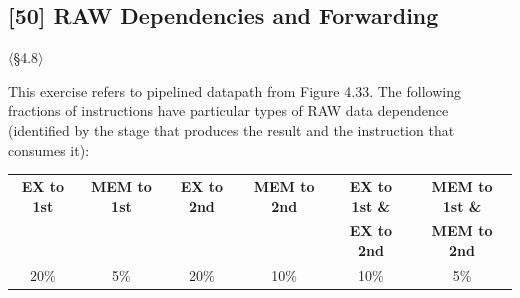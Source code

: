 \problembreak

\subsection{[50] RAW Dependencies and Forwarding}
\hypertarget{prob-4.26}{}
\noindent$\langle$\S4.8$\rangle$\medskip

\noindent This exercise refers to pipelined datapath from Figure 4.33. The
following fractions of instructions have particular types of RAW data
dependence (identified by the stage that produces the result and the
instruction that consumes it):

\begin{center}
\begin{tabular}{cccccc}
\toprule
\textbf{EX to 1st} & \textbf{MEM to 1st} & \textbf{EX to 2nd} &
\textbf{MEM to 2nd} & \textbf{EX to 1st \&} & \textbf{MEM to 1st \&} \\
& & & & \textbf{EX to 2nd} & \textbf{MEM to 2nd} \\
\midrule
20\% & 5\% & 20\% & 10\% & 10\% & 5\% \\
\bottomrule
\end{tabular}
\end{center}

